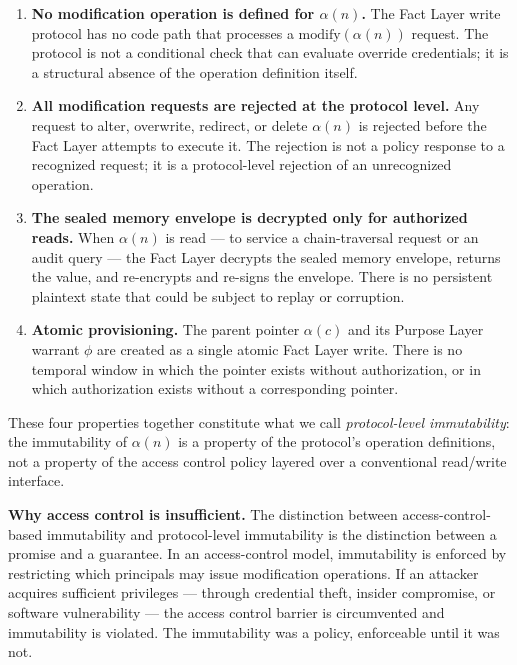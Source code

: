 \begin{enumerate}
    \item[(W1)] \textbf{No modification operation is defined for $\alpha(n)$.} The Fact Layer write protocol has no code path that processes a $\text{modify}(\alpha(n))$ request. The protocol is not a conditional check that can evaluate override credentials; it is a structural absence of the operation definition itself.
    \item[(W2)] \textbf{All modification requests are rejected at the protocol level.} Any request to alter, overwrite, redirect, or delete $\alpha(n)$ is rejected before the Fact Layer attempts to execute it. The rejection is not a policy response to a recognized request; it is a protocol-level rejection of an unrecognized operation.
    \item[(W3)] \textbf{The sealed memory envelope is decrypted only for authorized reads.} When $\alpha(n)$ is read --- to service a chain-traversal request or an audit query --- the Fact Layer decrypts the sealed memory envelope, returns the value, and re-encrypts and re-signs the envelope. There is no persistent plaintext state that could be subject to replay or corruption.
    \item[(W4)] \textbf{Atomic provisioning.} The parent pointer $\alpha(c)$ and its Purpose Layer warrant $\phi$ are created as a single atomic Fact Layer write. There is no temporal window in which the pointer exists without authorization, or in which authorization exists without a corresponding pointer.
\end{enumerate}

These four properties together constitute what we call \emph{protocol-level immutability}: the immutability of $\alpha(n)$ is a property of the protocol's operation definitions, not a property of the access control policy layered over a conventional read/write interface.

\medskip
\noindent\textbf{Why access control is insufficient.} The distinction between access-control-based immutability and protocol-level immutability is the distinction between a promise and a guarantee. In an access-control model, immutability is enforced by restricting which principals may issue modification operations. If an attacker acquires sufficient privileges --- through credential theft, insider compromise, or software vulnerability --- the access control barrier is circumvented and immutability is violated. The immutability was a policy, enforceable until it was not.

